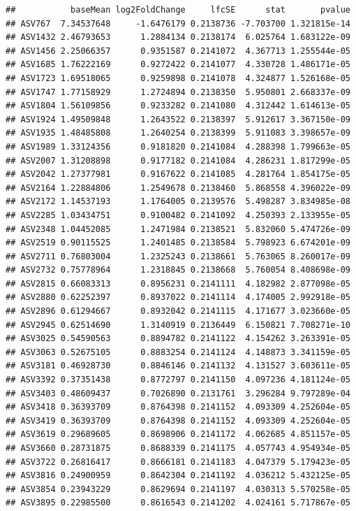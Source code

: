 \documentclass[]{article}
\begin{document}
\begin{verbatim}
##           baseMean log2FoldChange     lfcSE      stat       pvalue
## ASV767  7.34537648     -1.6476179 0.2138736 -7.703700 1.321815e-14
## ASV1432 2.46793653      1.2884134 0.2138174  6.025764 1.683122e-09
## ASV1456 2.25066357      0.9351587 0.2141072  4.367713 1.255544e-05
## ASV1685 1.76222169      0.9272422 0.2141077  4.330728 1.486171e-05
## ASV1723 1.69518065      0.9259898 0.2141078  4.324877 1.526168e-05
## ASV1747 1.77158929      1.2724894 0.2138350  5.950801 2.668337e-09
## ASV1804 1.56109856      0.9233282 0.2141080  4.312442 1.614613e-05
## ASV1924 1.49509848      1.2643522 0.2138397  5.912617 3.367150e-09
## ASV1935 1.48485808      1.2640254 0.2138399  5.911083 3.398657e-09
## ASV1989 1.33124356      0.9181820 0.2141084  4.288398 1.799663e-05
## ASV2007 1.31208898      0.9177182 0.2141084  4.286231 1.817299e-05
## ASV2042 1.27377981      0.9167622 0.2141085  4.281764 1.854175e-05
## ASV2164 1.22884806      1.2549678 0.2138460  5.868558 4.396022e-09
## ASV2172 1.14537193      1.1764005 0.2139576  5.498287 3.834985e-08
## ASV2285 1.03434751      0.9100482 0.2141092  4.250393 2.133955e-05
## ASV2348 1.04452085      1.2471984 0.2138521  5.832060 5.474726e-09
## ASV2519 0.90115525      1.2401485 0.2138584  5.798923 6.674201e-09
## ASV2711 0.76803004      1.2325243 0.2138661  5.763065 8.260017e-09
## ASV2732 0.75778964      1.2318845 0.2138668  5.760054 8.408698e-09
## ASV2815 0.66083313      0.8956231 0.2141111  4.182982 2.877098e-05
## ASV2880 0.62252397      0.8937022 0.2141114  4.174005 2.992918e-05
## ASV2896 0.61294667      0.8932042 0.2141115  4.171677 3.023660e-05
## ASV2945 0.62514690      1.3140919 0.2136449  6.150821 7.708271e-10
## ASV3025 0.54590563      0.8894782 0.2141122  4.154262 3.263391e-05
## ASV3063 0.52675105      0.8883254 0.2141124  4.148873 3.341159e-05
## ASV3181 0.46928730      0.8846146 0.2141132  4.131527 3.603611e-05
## ASV3392 0.37351438      0.8772797 0.2141150  4.097236 4.181124e-05
## ASV3403 0.48609437      0.7026890 0.2131761  3.296284 9.797289e-04
## ASV3418 0.36393709      0.8764398 0.2141152  4.093309 4.252604e-05
## ASV3419 0.36393709      0.8764398 0.2141152  4.093309 4.252604e-05
## ASV3619 0.29689605      0.8698906 0.2141172  4.062685 4.851157e-05
## ASV3660 0.28731875      0.8688339 0.2141175  4.057743 4.954934e-05
## ASV3722 0.26816417      0.8666181 0.2141183  4.047379 5.179423e-05
## ASV3816 0.24900959      0.8642304 0.2141192  4.036212 5.432125e-05
## ASV3854 0.23943229      0.8629694 0.2141197  4.030313 5.570258e-05
## ASV3895 0.22985500      0.8616543 0.2141202  4.024161 5.717867e-05

\end{verbatim}
\end{document}
